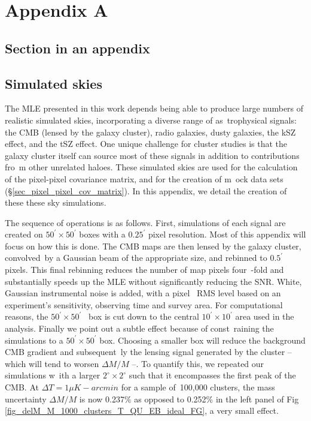 \chapter{Appendix A}
\section{Section in an appendix}

\section{Simulated skies}
\label{sec_appendix_simulated_skies}
The MLE presented in this work depends being able to produce large numbers of realistic simulated skies, incorporating a diverse range of as\
trophysical signals: the CMB (lensed by the galaxy cluster), radio galaxies, dusty galaxies, the kSZ effect, and the tSZ effect.
One unique challenge for cluster studies is that the galaxy cluster itself can source most of these signals in addition to contributions fro\
m other unrelated haloes. These simulated skies are used for the calculation of the pixel-pixel covariance matrix, and for the creation of m\
ock data sets (\S\ref{sec_pixel_pixel_cov_matrix}). In this appendix, we detail the creation of these these sky simulations.

The sequence of operations is as follows. First, simulations of each signal are created on $50^\prime \times 50^\prime$ boxes with a $0.25^\prime$ pixel resolution. Most of this appendix will focus on how this is done. The CMB maps are then lensed by the galaxy cluster, convolved\
 by a Gaussian beam of the appropriate size, and rebinned to $0.5^\prime$ pixels. This final rebinning reduces the number of map pixels four\
-fold and substantially speeds up the MLE without significantly reducing the SNR. White, Gaussian instrumental noise is added, with a pixel \
RMS level based on an experiment's sensitivity, observing time and survey area. For computational reasons, the $50^\prime \times 50^\prime$ \
box is cut down to the central $10^\prime \times 10^\prime$ area used in the analysis. Finally we point out a subtle effect because of const\
raining the simulations to a $50^\prime \times 50^\prime$ box. Choosing a smaller box will reduce the background CMB gradient and subsequent\
ly the lensing signal generated by the cluster -- which will tend to worsen $\Delta M/M$ --. To quantify this, we repeated our simulations w\
ith a larger $2^{\circ} \times 2^{\circ}$ such that it encompasses the first peak of the CMB. At $\Delta T = 1 \mu K-arcmin$ for a sample of\
 100,000 clusters, the mass uncertainty $\Delta M/M$ is now 0.237\% as opposed to 0.252\% in the left panel of Fig \ref{fig_delM_M_1000_clusters_T_QU_EB_ideal_FG}, a very small effect.

